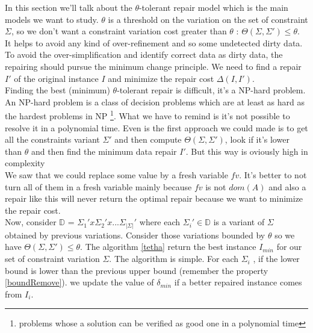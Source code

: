 \documentclass[letterpaper, 12pt]{report}
\theoremstyle{definition}
\begin{document}
In this section we'll talk about the $\theta$-tolerant repair model which is the main models we want to study. $\theta$ is a threshold on the variation on the set of constraint $\Sigma$, so we don't want a constraint variation cost greater than $\theta$ : $\Theta(\Sigma,\Sigma') \leq \theta$. It helps to avoid any kind of over-refinement and so some undetected dirty data. To avoid the over-simplification and identify correct data as dirty data, the repairing should pursue the minimum change principle. We need to find a repair $I'$ of the original instance $I$ and minimize the repair cost $\Delta(I,I')$.\\

Finding the best (minimum) $\theta$-tolerant repair is difficult, it's a NP-hard problem. An NP-hard problem is a class of decision problems which are at least as hard as the hardest problems in NP \footnote{problems whose a solution can be verified as good one in a polynomial time}. What we have to remind is it's not possible to resolve it in a polynomial time. Even is the first approach we could made is to get all the constraints variant $\Sigma'$ and then compute $\Theta(\Sigma,\Sigma')$, look if it's lower than $\theta$ and then find the minimum data repair $I'$. But this way is oviously high in complexity\\

We saw that we could replace some value by a fresh variable $fv$. It's better to not turn all of them in a fresh variable mainly because $fv$ is not $dom(A)$ and also a repair like this will never return the optimal repair because we want to minimize the repair cost. \\

Now, consider $\mathbb{D}$ = $\Sigma_1 ' x \Sigma_2' x ... \Sigma_{|\Sigma|}'$ where each $\Sigma_i' \in \mathbb{D}$ is a variant of $\Sigma$ obtained by previous variations. Consider those variations bounded by $\theta$ so we have $\Theta(\Sigma,\Sigma') \leq \theta$. The algorithm \ref{tetha} return the best instance $I_{min}$ for our set of constraint variation $\Sigma$. The algorithm is simple. For each $\Sigma_i$ , if the lower bound is lower than the previous upper bound (remember the property \ref{boundRemove}). we update the value of $\delta_{min}$ if a better repaired instance comes from $I_i$. \\
\end{document}
